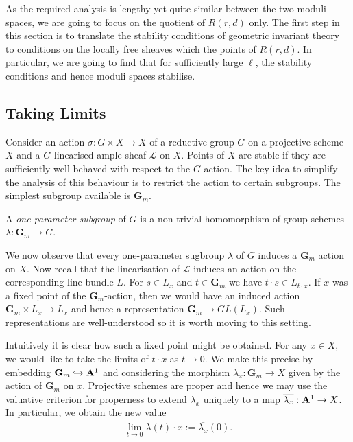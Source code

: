 \documentclass[12pt]{ociamthesis}  %
\begin{document}
As the required analysis is lengthy yet quite similar between the
two moduli spaces, we are going to focus on the quotient of $R(r,d)$ only.
The first step in this section is to translate the stability
conditions of geometric invariant theory to conditions on the locally
free sheaves which the points of $R(r,d)$.  In particular, we
are going to find that for sufficiently large $\ell$,
the stability conditions and hence moduli spaces stabilise.

\subsection{Taking Limits}

Consider an action $\sigma : G \times X\to X$ of a reductive group $G$
on a projective scheme $X$ and a $G$-linearised ample sheaf
$\mathscr L$ on $X$. Points of $X$ are stable if they are sufficiently
well-behaved with respect to the $G$-action. The key idea to simplify
the analysis of this behaviour is to restrict the action to certain
subgroups. The simplest subgroup available is $\mathbf G_m$.

\begin{definition}
  A \emph{one-parameter subgroup} of $G$ is a non-trivial homomorphism
  of group schemes $\lambda : \mathbf G_m \to G$.
\end{definition}

We now observe that every one-parameter sugbroup $\lambda$ of $G$
induces a $\mathbf G_m$ action on $X$. Now recall that the
linearisation of $\mathscr L$ induces an action on the corresponding
line bundle $L$. For $s\in L_x$ and $t\in \mathbf G_m$ we have
$t\cdot s\in L_{t\cdot x}$. If $x$ was a fixed point of the
$\mathbf G_m$-action, then we would have an induced action
$\mathbf G_m\times L_x \to L_x$ and hence a representation
$\mathbf G_m\to GL(L_x)$. Such representations are well-understood
so it is worth moving to this setting.

Intuitively it is clear how such a fixed point might be obtained.
For any $x\in X$, we would like to take the limits of $t\cdot x$
as $t\to 0$. We make this precise
by embedding $\mathbf G_m\hookrightarrow\mathbf A^1$ and
considering the morphism $\lambda_x : \mathbf G_m \to X$ given by
the action of $\mathbf G_m$ on $x$.
Projective schemes are proper and hence we may use the valuative
criterion for properness to extend $\lambda_x$ uniquely to a map
$\overline{\lambda_x} : \mathbf{A}^{1}_{} \to X$.
In particular, we obtain the new value
\begin{align*}
  \lim_{t\to 0}\lambda(t)\cdot x := \overline{\lambda_x}(0).
\end{align*}
\end{document}
